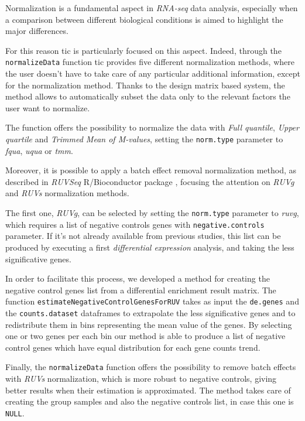 Normalization is a fundamental aspect in \textit{RNA-seq} data analysis, especially when a comparison between different biological conditions is aimed to highlight the major differences.

For this reason \gls{tic} is particularly focused on this aspect. Indeed, through the \lstinline!normalizeData! function \gls{tic} provides five different normalization methods, where the user doesn't have to take care of any particular additional information, except for the normalization method.
Thanks to the design matrix based system, the method allows to automatically subset the data only to the relevant factors the user want to normalize.

The function offers the possibility to normalize the data with \textit{Full quantile}, \textit{Upper quartile} and \textit{Trimmed Mean of M-values}, setting the \lstinline!norm.type! parameter to \textit{fqua}, \textit{uqua} or \textit{tmm}.

Moreover, it is possible to apply a batch effect removal normalization method, as described in \textit{RUVSeq} R/Bioconductor package \cite{Risso2014h}, focusing the attention on \textit{RUVg} and \textit{RUVs} normalization methods.

The first one, \textit{RUVg}, can be selected by setting the \lstinline!norm.type! parameter to \textit{ruvg}, which requires a list of negative controls genes with \lstinline!negative.controls! parameter.
If it's not already available from previous studies, this list can be produced by executing a first \textit{differential expression} analysis, and taking the less significative genes.

In order to facilitate this process, we developed a method for creating the negative control genes list from a differential enrichment result matrix.
The function \lstinline!estimateNegativeControlGenesForRUV! takes as input the \lstinline!de.genes! and the \lstinline!counts.dataset! dataframes to extrapolate the less significative genes and to redistribute them in bins representing the mean value of the genes.
By selecting one or two genes per each bin our method is able to produce a list of negative control genes which have equal distribution for each gene counts trend.

Finally, the \lstinline!normalizeData! function offers the possibility to remove batch effects with \textit{RUVs} normalization, which is more robust to negative controls, giving better results when their estimation is approximated.
The method takes care of creating the group samples and also the negative controls list, in case this one is \lstinline!NULL!.
